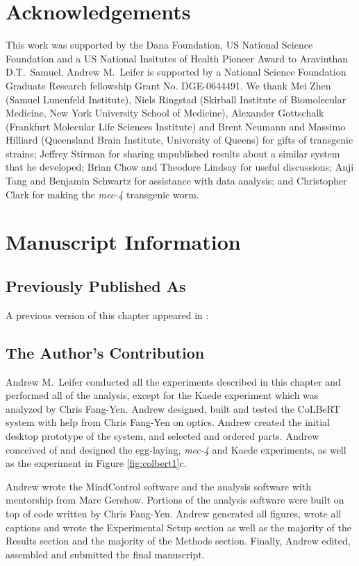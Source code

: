 \section{Acknowledgements}
This work was supported by the Dana Foundation, US National Science Foundation and a US National Insitutes of Health Pioneer Award to Aravinthan D.T.~Samuel. Andrew M.~Leifer is supported by a National Science Foundation Graduate Research fellowship Grant No. DGE-0644491. We thank Mei Zhen (Samuel Lunenfeld Institute), Niels Ringstad (Skirball Institute of Biomolecular Medicine, New York University School of Medicine), Alexander Gottschalk (Frankfurt Molecular Life Sciences Institute) and Brent Neumann and Massimo Hilliard (Queensland Brain Institute, University of Queens) for gifts of transgenic strains; Jeffrey Stirman for sharing unpublished results about a similar system that he developed; Brian Chow and Theodore Lindsay for useful discussions; Anji Tang and Benjamin Schwartz for assistance with data analysis; and Christopher Clark for making the \textit{mec-4} transgenic worm.

\section{Manuscript Information}
\subsection{Previously Published As}
A previous version of this chapter appeared in \citep{leifer_optogenetic_2011}:


\subsection{The Author's Contribution}
Andrew M.~Leifer conducted all the experiments described in this chapter and performed all of the analysis, except for the Kaede experiment which was analyzed by Chris Fang-Yen. Andrew designed, built and tested the CoLBeRT system with help from Chris Fang-Yen on optics.  Andrew created the initial desktop prototype of the system, and selected and ordered parts.  Andrew conceived of and designed the egg-laying, \textit{mec-4} and Kaede experiments, as well as the experiment in Figure \ref{fig:colbert1}c.   

Andrew wrote the MindControl software and the analysis software with mentorship from Marc Gershow. Portions of the analysis software were built on top of code written by Chris Fang-Yen. Andrew generated all figures, wrote all captions and wrote the Experimental Setup section as well as the majority of the Results section and the majority of the Methods section.  Finally, Andrew edited, assembled and submitted the final manuscript.
